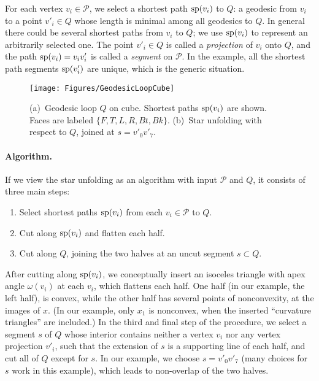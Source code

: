 \pdfoutput=1  \documentclass[]{article}
\newcommand{\figlab}[1]{\label{fig:#1}}
\def\P{{\mathcal P}}
\def\o{{\omega}}
\def\sp{\mathop{\rm sp}\nolimits}
\newcommand{\squeezelist}{\setlength{\itemsep}{0pt}}
\begin{document}
For each vertex $v_i \in \P$, we select a shortest path
$\sp(v_i)$ to $Q$: a geodesic from $v_i$ to a point $v'_i \in Q$
whose length is minimal among all geodesics to $Q$.
In general there could be several shortest paths from $v_i$ to $Q$;
we use $\sp(v_i)$ to represent an arbitrarily selected one.
The point $v'_i \in Q$ is called
a \emph{projection} of $v_i$ onto $Q$,
and the path $\sp(v_i) = v_i v'_i$ is called a \emph{segment} on $\P$.
In the example, all the shortest path segments $\sp(v'_i)$ are unique,
which is the generic situation.

\begin{figure}[htbp]
\centering
\texttt{[image: Figures/GeodesicLoopCube]}
\caption{
(a)~Geodesic loop $Q$ on cube.
Shortest paths $\sp(v_i)$ are shown.  Faces are labeled
$\{F,T,L,R,Bt,Bk\}$.
(b)~Star unfolding with respect to $Q$,
joined at 
$s=v'_0 v'_7$.
}
\figlab{GeodesicLoopCube}
\end{figure}



\paragraph{Algorithm.}
If we view the star unfolding as an algorithm
with input $\P$ and $Q$, it consists of three
main steps:
\begin{enumerate}
\squeezelist
\item Select shortest paths $\sp(v_i)$ from each $v_i \in \P$ to $Q$.
\item Cut along $\sp(v_i)$ and flatten each half.
\item Cut along $Q$, joining the two halves at an uncut segment $s \subset Q$.
\end{enumerate}

After cutting along $\sp(v_i)$, we conceptually insert an isoceles
triangle with apex angle $\o(v_i)$ at each $v_i$, which flattens
each half.  One half (in our example, the left half), is convex,
while the other half has several points of nonconvexity,
at the images of $x$.
(In our example, only $x_1$ is nonconvex, when the inserted
``curvature triangles'' are included.)
In the third and final step of the procedure,
we select a segment $s$ of $Q$ whose interior contains
neither a vertex $v_i$ nor any vertex projection $v'_i$, 
such that the extension of $s$ is a supporting line of each half,
and cut all of $Q$ except for $s$.
In our example, we choose 
$s=v'_0 v'_7$
(many choices for $s$ work in this example),
which leads to non-overlap of the two halves.
\end{document}
